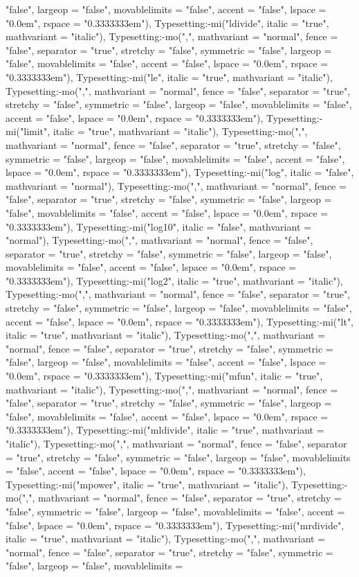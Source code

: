 \documentclass{article}
\begin{document}
{{{\begin{maplegroup}
\begin{maplelatex}
"false", largeop = "false", movablelimits = "false", accent = "false", lspace = "0.0em", rspace = "0.3333333em"), Typesetting:-mi("ldivide", italic = "true", mathvariant = "italic"), Typesetting:-mo(",", mathvariant = "normal", fence = "false", separator = "true", stretchy = "false", symmetric = "false", largeop = "false", movablelimits = "false", accent = "false", lspace = "0.0em", rspace = "0.3333333em"), Typesetting:-mi("le", italic = "true", mathvariant = "italic"), Typesetting:-mo(",", mathvariant = "normal", fence = "false", separator = "true", stretchy = "false", symmetric = "false", largeop = "false", movablelimits = "false", accent = "false", lspace = "0.0em", rspace = "0.3333333em"), Typesetting:-mi("limit", italic = "true", mathvariant = "italic"), Typesetting:-mo(",", mathvariant = "normal", fence = "false", separator = "true", stretchy = "false", symmetric = "false", largeop = "false", movablelimits = "false", accent = "false", lspace = "0.0em", rspace = "0.3333333em"), Typesetting:-mi("log", italic = "false", mathvariant = "normal"), Typesetting:-mo(",", mathvariant = "normal", fence = "false", separator = "true", stretchy = "false", symmetric = "false", largeop = "false", movablelimits = "false", accent = "false", lspace = "0.0em", rspace = "0.3333333em"), Typesetting:-mi("log10", italic = "false", mathvariant = "normal"), Typesetting:-mo(",", mathvariant = "normal", fence = "false", separator = "true", stretchy = "false", symmetric = "false", largeop = "false", movablelimits = "false", accent = "false", lspace = "0.0em", rspace = "0.3333333em"), Typesetting:-mi("log2", italic = "true", mathvariant = "italic"), Typesetting:-mo(",", mathvariant = "normal", fence = "false", separator = "true", stretchy = "false", symmetric = "false", largeop = "false", movablelimits = "false", accent = "false", lspace = "0.0em", rspace = "0.3333333em"), Typesetting:-mi("lt", italic = "true", mathvariant = "italic"), Typesetting:-mo(",", mathvariant = "normal", fence = "false", separator = "true", stretchy = "false", symmetric = "false", largeop = "false", movablelimits = "false", accent = "false", lspace = "0.0em", rspace = "0.3333333em"), Typesetting:-mi("mfun", italic = "true", mathvariant = "italic"), Typesetting:-mo(",", mathvariant = "normal", fence = "false", separator = "true", stretchy = "false", symmetric = "false", largeop = "false", movablelimits = "false", accent = "false", lspace = "0.0em", rspace = "0.3333333em"), Typesetting:-mi("mldivide", italic = "true", mathvariant = "italic"), Typesetting:-mo(",", mathvariant = "normal", fence = "false", separator = "true", stretchy = "false", symmetric = "false", largeop = "false", movablelimits = "false", accent = "false", lspace = "0.0em", rspace = "0.3333333em"), Typesetting:-mi("mpower", italic = "true", mathvariant = "italic"), Typesetting:-mo(",", mathvariant = "normal", fence = "false", separator = "true", stretchy = "false", symmetric = "false", largeop = "false", movablelimits = "false", accent = "false", lspace = "0.0em", rspace = "0.3333333em"), Typesetting:-mi("mrdivide", italic = "true", mathvariant = "italic"), Typesetting:-mo(",", mathvariant = "normal", fence = "false", separator = "true", stretchy = "false", symmetric = "false", largeop = "false", movablelimits = 
\end{maplelatex}
\end{maplegroup}}}}
\end{document}
